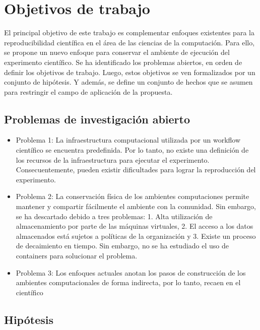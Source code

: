 \chapter{Objetivos de trabajo}\label{sec:objetivos} 
El principal objetivo de este trabajo es complementar enfoques existentes para la reproducibilidad científica en el área de las ciencias de la computación. Para ello, se propone un nuevo enfoque para conservar el ambiente de ejecución del experimento científico.
Se ha identificado los problemas abiertos, en orden de definir los objetivos de trabajo. Luego, estos objetivos se ven formalizados por un conjunto de hipótesis. Y además, se define un conjunto de hechos que se asumen para restringir el campo de aplicación de la propuesta.


\section{Problemas de investigación abierto}
\begin{itemize}
	\item Problema 1: La infraestructura computacional utilizada por un workflow científico se encuentra predefinida. Por lo tanto, no existe una definición de los recursos de la infraestructura para ejecutar el experimento. Consecuentemente, pueden existir dificultades para lograr la reproducción del experimento. 
	\item Problema 2: La conservación física de los ambientes computaciones permite mantener y compartir fácilmente el ambiente con la comunidad. Sin embargo, se ha descartado debido a tres problemas: 
		1. Alta utilización de almacenamiento por parte de las máquinas virtuales, 
		2. El acceso a los datos almacenados está sujetos a políticas de la organización 
		y 3. Existe un proceso de decaimiento en tiempo.
		Sin embargo, no se ha estudiado el uso de containers para solucionar el problema.
	\item Problema 3: Los enfoques actuales anotan los pasos de construcción de los ambientes computacionales de forma indirecta, por lo tanto, recaen en el científico 
\end{itemize}

\section{Hipótesis}

